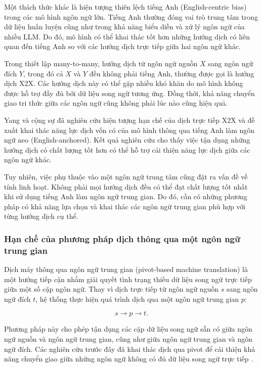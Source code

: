 Một thách thức khác là hiện tượng thiên lệch tiếng Anh (English-centric bias) trong các mô hình ngôn ngữ lớn. Tiếng Anh thường đóng vai trò trung tâm trong dữ liệu huấn luyện cũng như trong khả năng biểu diễn và xử lý ngôn ngữ của nhiều LLM. Do đó, mô hình có thể khai thác tốt hơn những hướng dịch có liên quan đến tiếng Anh so với các hướng dịch trực tiếp giữa hai ngôn ngữ khác.

Trong thiết lập many-to-many, hướng dịch từ ngôn ngữ nguồn $X$ sang ngôn ngữ đích $Y$, trong đó cả $X$ và $Y$ đều không phải tiếng Anh, thường được gọi là hướng dịch X2X. Các hướng dịch này có thể gặp nhiều khó khăn do mô hình không được hỗ trợ đầy đủ bởi dữ liệu song ngữ tương ứng. Đồng thời, khả năng chuyển giao tri thức giữa các ngôn ngữ cũng không phải lúc nào cũng hiệu quả.

Yang và cộng sự \cite{yang-etal-2025-enanchored} đã nghiên cứu hiện tượng hạn chế của dịch trực tiếp X2X và đề xuất khai thác năng lực dịch vốn có của mô hình thông qua tiếng Anh làm ngôn ngữ neo (English-anchored). Kết quả nghiên cứu cho thấy việc tận dụng những hướng dịch có chất lượng tốt hơn có thể hỗ trợ cải thiện năng lực dịch giữa các ngôn ngữ khác.

Tuy nhiên, việc phụ thuộc vào một ngôn ngữ trung tâm cũng đặt ra vấn đề về tính linh hoạt. Không phải mọi hướng dịch đều có thể đạt chất lượng tốt nhất khi sử dụng tiếng Anh làm ngôn ngữ trung gian. Do đó, cần có những phương pháp có khả năng lựa chọn và khai thác các ngôn ngữ trung gian phù hợp với từng hướng dịch cụ thể.

\subsubsection{Hạn chế của phương pháp dịch thông qua một ngôn ngữ trung gian}

Dịch máy thông qua ngôn ngữ trung gian (pivot-based machine translation) là một hướng tiếp cận nhằm giải quyết tình trạng thiếu dữ liệu song ngữ trực tiếp giữa một số cặp ngôn ngữ. Thay vì dịch trực tiếp từ ngôn ngữ nguồn $s$ sang ngôn ngữ đích $t$, hệ thống thực hiện quá trình dịch qua một ngôn ngữ trung gian $p$:

\begin{equation}
    s \rightarrow p \rightarrow t.
\end{equation}

Phương pháp này cho phép tận dụng các cặp dữ liệu song ngữ sẵn có giữa ngôn ngữ nguồn và ngôn ngữ trung gian, cũng như giữa ngôn ngữ trung gian và ngôn ngữ đích. Các nghiên cứu trước đây đã khai thác dịch qua pivot để cải thiện khả năng chuyển giao giữa những ngôn ngữ không có đủ dữ liệu song ngữ trực tiếp \cite{kim-etal-2019-pivot}.

